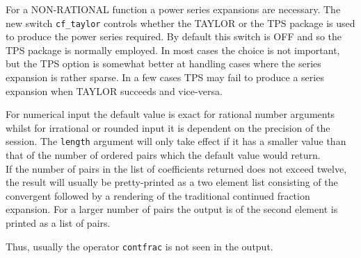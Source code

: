 \hypertarget{switch:CF_TAYLOR}{}

For a NON-RATIONAL function a power series expansions are necessary. The new
switch \texttt{cf\_taylor} controls whether the TAYLOR or the TPS package is 
used to produce the power series required. By default this switch is OFF and
so the TPS package is normally employed.
In most cases the choice is not important, but the TPS option is somewhat better
at handling cases where the series expansion is rather sparse. In a few cases
TPS may fail to produce a series expansion when TAYLOR succeeds and vice-versa.

For numerical input the default value is exact for
rational number arguments whilst for irrational or rounded input it is
dependent on the precision of the session. The
\texttt{length} argument will only take effect if it has a smaller
value than that of the number of ordered pairs which the default
value would return.\\[\baselineskip]

If the number of pairs in the list of coefficients returned does not exceed
twelve, the result will usually be pretty-printed as a two element list
consisting of the convergent followed by a rendering of the traditional
continued fraction expansion. For a larger number of pairs the output is
of the second element is printed as a list of pairs.

Thus, usually the operator \texttt{contfrac} is not seen in the output.

